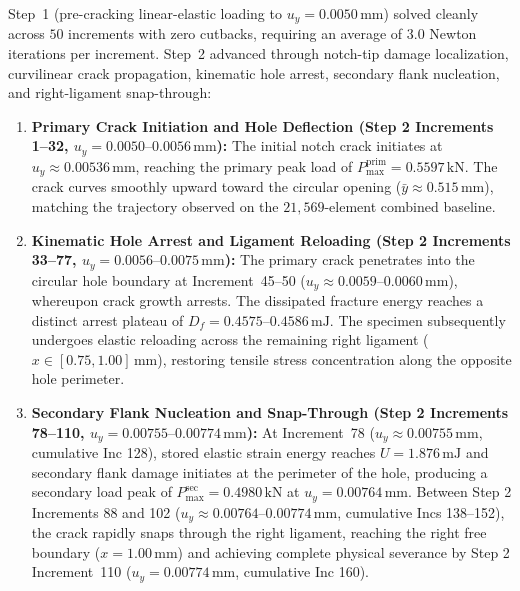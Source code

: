 Step~1 (pre-cracking linear-elastic loading to $u_y = 0.0050\,\mathrm{mm}$) solved cleanly across $50$ increments with zero cutbacks, requiring an average of $3.0$ Newton iterations per increment. Step~2 advanced through notch-tip damage localization, curvilinear crack propagation, kinematic hole arrest, secondary flank nucleation, and right-ligament snap-through:
\begin{enumerate}
  \item \textbf{Primary Crack Initiation and Hole Deflection (Step 2 Increments 1--32, $u_y = 0.0050\text{--}0.0056\,\mathrm{mm}$):} The initial notch crack initiates at $u_y \approx 0.00536\,\mathrm{mm}$, reaching the primary peak load of $P_{\max}^{\mathrm{prim}} = 0.5597\,\mathrm{kN}$. The crack curves smoothly upward toward the circular opening ($\bar{y} \approx 0.515\,\mathrm{mm}$), matching the trajectory observed on the $21{,}569$-element combined baseline.
  \item \textbf{Kinematic Hole Arrest and Ligament Reloading (Step 2 Increments 33--77, $u_y = 0.0056\text{--}0.0075\,\mathrm{mm}$):} The primary crack penetrates into the circular hole boundary at Increment~45--50 ($u_y \approx 0.0059\text{--}0.0060\,\mathrm{mm}$), whereupon crack growth arrests. The dissipated fracture energy reaches a distinct arrest plateau of $D_f = 0.4575\text{--}0.4586\,\mathrm{mJ}$. The specimen subsequently undergoes elastic reloading across the remaining right ligament ($x \in [0.75, 1.00]\,\mathrm{mm}$), restoring tensile stress concentration along the opposite hole perimeter.
  \item \textbf{Secondary Flank Nucleation and Snap-Through (Step 2 Increments 78--110, $u_y = 0.00755\text{--}0.00774\,\mathrm{mm}$):} At Increment~78 ($u_y \approx 0.00755\,\mathrm{mm}$, cumulative Inc 128), stored elastic strain energy reaches $U = 1.876\,\mathrm{mJ}$ and secondary flank damage initiates at the perimeter of the hole, producing a secondary load peak of $P_{\max}^{\mathrm{sec}} = 0.4980\,\mathrm{kN}$ at $u_y = 0.00764\,\mathrm{mm}$. Between Step 2 Increments 88 and 102 ($u_y \approx 0.00764\text{--}0.00774\,\mathrm{mm}$, cumulative Incs 138--152), the crack rapidly snaps through the right ligament, reaching the right free boundary ($x = 1.00\,\mathrm{mm}$) and achieving complete physical severance by Step 2 Increment~110 ($u_y = 0.00774\,\mathrm{mm}$, cumulative Inc 160).

\end{enumerate}
